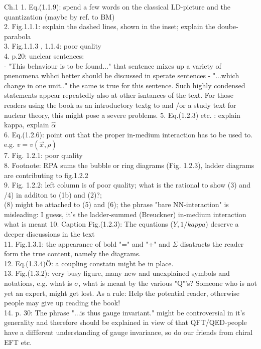 \documentclass[prl,aps,12pt]{revtex4}
\begin{document}
	Ch.1
1. Eq.(1.1.9): spend a few words on the classical LD-picture and the quantization (maybe by ref. to BM)\\
2. Fig.1.1.1: explain the dashed lines, shown in the inset; explain the doube-parabola\\
3. Fig.1.1.3 , 1.1.4: poor quality\\
4. p.20: unclear sentences:\\
- "This behaviour is to be found..." that sentence mixes up a variety of pnenomena whhci better should be discussed in sperate sentences
- "...which change in one unit.." the same is true for this sentence. 
Such highly condensed statements appear repeatedly also at other isntances of the text. For those readers using the book as an 
introductory textg to and /or a study text for nuclear theory, this might pose a severe problems.
5. Eq.(1.2.3) etc. : explain kappa, explain $\hat{\alpha}$\\
6. Eq.(1.2.6): point out that the proper in-medium interaction has to be used to. e.g. $v=v(\vec{x},\rho)$\\
7. Fig. 1.2.1: poor quality\\
8. Footnote: RPA sums the bubble or ring diagrams (Fig. 1.2.3), ladder diagrams are contributing to fig.1.2.2\\     
9. Fig. 1.2.2: left column is of poor quality; what is the rational to show (3) and /4) in additon to (1b) and (2)?;\\ 
(8) might be attached to (5) and (6); the phrase "bare NN-interaction" is misleading: I guess, it's the ladder-summed (Breuckner) 
in-medium interaction what is meant
10. Caption Fig.(1.2.3): The equations ($Y, 1/kappa$) deserve a deeper discussions in the text\\
11. Fig.1.3.1: the appearance of bold "=" and "+" and $\Sigma$ disatracts the reader form the true content, namely the  diagrams.\\
12. Eq.(1.3.4)Ö: a coupling constatn might be in place.\\
13. Fig.(1.3.2): very busy figure, many new and unexplained symbols and notations, e.g. what is $\sigma$, what is meant by the various "Q"'s? 
Someone who is not yet an expert, might get lost. As a rule: Help the potential reader, otherwise people may give up reading the book!\\
14. p. 30: The phrase "...is thus gauge invariant." might be controversial in it's generality and therefore should be explained in view of that 
QFT/QED-people have a diffferent understanding of gauge invariance, so do our friends from chiral EFT etc.  \\
\end{document}
